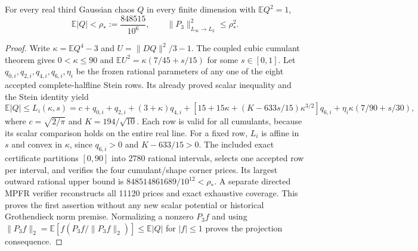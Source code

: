 \begin{theorem}
For every real third Gaussian chaos $Q$ in every finite dimension with
$\mathbb E Q^2=1$,
\[
 \mathbb E|Q|<\rho_*:=\frac{848515}{10^6},\qquad
 \|P_3\|_{L_\infty\to L_2}^2\le\rho_*^2.
\]
\end{theorem}
\begin{proof}
Write $\kappa=\mathbb E Q^4-3$ and
$U=\|DQ\|^2/3-1$. The coupled cubic cumulant theorem gives
$0<\kappa\le90$ and
$\mathbb E U^2=\kappa(7/45+s/15)$ for some $s\in[0,1]$.
Let $q_{0,i},q_{2,i},q_{4,i},q_{6,i},\eta_i$ be the frozen rational
parameters of any one of the eight accepted complete-halfline Stein rows.
Its already proved scalar inequality and the Stein identity yield
\[
\mathbb E|Q|\le L_i(\kappa,s)
 =c+q_{0,i}+q_{2,i}+(3+\kappa)q_{4,i}
 +[15+15\kappa+(K-633s/15)\kappa^{3/2}]q_{6,i}
 +\eta_i\kappa(7/90+s/30),
\]
where $c=\sqrt{2/\pi}$ and $K=194/\sqrt{10}$.
Each row is valid for all cumulants, because its scalar comparison holds
on the entire real line. For a fixed row, $L_i$ is affine in $s$ and
convex in $\kappa$, since $q_{6,i}>0$ and $K-633/15>0$.
The included exact certificate partitions $[0,90]$ into 2780 rational
intervals, selects one accepted row per interval, and verifies the four
cumulant/shape corner prices. Its largest outward rational upper bound
is $848514861689/10^{12}<\rho_*$. A separate directed MPFR verifier
reconstructs all 11120 prices and exact exhaustive coverage. This proves
the first assertion without any new scalar potential or historical
Grothendieck norm premise. Normalizing a nonzero $P_3f$ and using
$\|P_3f\|_2=\mathbb E[f(P_3f/\|P_3f\|_2)]\le\mathbb E|Q|$
for $|f|\le1$ proves the projection consequence.
\end{proof}
